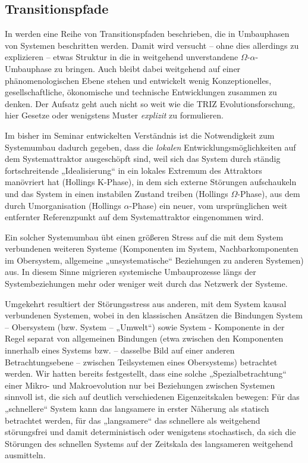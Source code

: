 \documentclass[11pt,a4paper]{article}
\begin{document}
\subsection{Transitionspfade}

In \cite{Geels2007} werden eine Reihe von Transitionspfaden beschrieben, die
in Umbauphasen von Systemen beschritten werden. Damit wird versucht -- ohne
dies allerdings zu explizieren -- etwas Struktur in die in \cite{Holling2000}
weitgehend unverstandene $\Omega$-$\alpha$-Umbauphase zu bringen. Auch
\cite{Geels2007} bleibt dabei weitgehend auf einer phänomenologischen Ebene
stehen und entwickelt wenig Konzeptionelles, gesellschaftliche, ökonomische
und technische Entwicklungen zusammen zu denken. Der Aufsatz geht auch nicht
so weit wie die TRIZ Evolutionsforschung, hier Gesetze oder wenigstens Muster
\emph{explizit} zu formulieren.

Im bisher im Seminar entwickelten Verständnis ist die Notwendigkeit zum
Systemumbau dadurch gegeben, dass die \emph{lokalen} Entwicklungsmöglichkeiten
auf dem Systemattraktor ausgeschöpft sind, weil sich das System durch ständig
fortschreitende „Idealisierung“ in ein lokales Extremum des Attraktors
manövriert hat (Hollings K-Phase), in dem sich externe Störungen aufschaukeln
und das System in einen instabilen Zustand treiben (Hollings $\Omega$-Phase),
aus dem durch Umorganisation (Hollings $\alpha$-Phase) ein neuer, vom
ursprünglichen weit entfernter Referenzpunkt auf dem Systemattraktor
eingenommen wird.

Ein solcher Systemumbau übt einen größeren Stress auf die mit dem System
verbundenen weiteren Systeme (Komponenten im System, Nachbarkomponenten im
Obersystem, allgemeine „unsystematische“ Beziehungen zu anderen Systemen) aus.
In diesem Sinne migrieren systemische Umbauprozesse längs der
Systembeziehungen mehr oder weniger weit durch das Netzwerk der Systeme.

Umgekehrt resultiert der Störungsstress aus anderen, mit dem System kausal
verbundenen Systemen, wobei in den klassischen Ansätzen die Bindungen System
-- Obersystem (bzw. System -- „Umwelt“) sowie System - Komponente in der Regel
separat von allgemeinen Bindungen (etwa zwischen den Komponenten innerhalb
eines Systems bzw. -- dasselbe Bild auf einer anderen Betrachtungsebene --
zwischen Teilsystemen eines Obersystems) betrachtet werden. Wir hatten bereits
festgestellt, dass eine solche „Spezialbetrachtung“ einer Mikro- und
Makroevolution nur bei Beziehungen zwischen Systemen sinnvoll ist, die sich
auf deutlich verschiedenen Eigenzeitskalen bewegen: Für das „schnellere“
System kann das langsamere in erster Näherung als statisch betrachtet werden,
für das „langsamere“ das schnellere als weitgehend störungsfrei und damit
deterministisch oder wenigstens stochastisch, da sich die Störungen des
schnellen Systems auf der Zeitskala des langsameren weitgehend ausmitteln.
\end{document}
